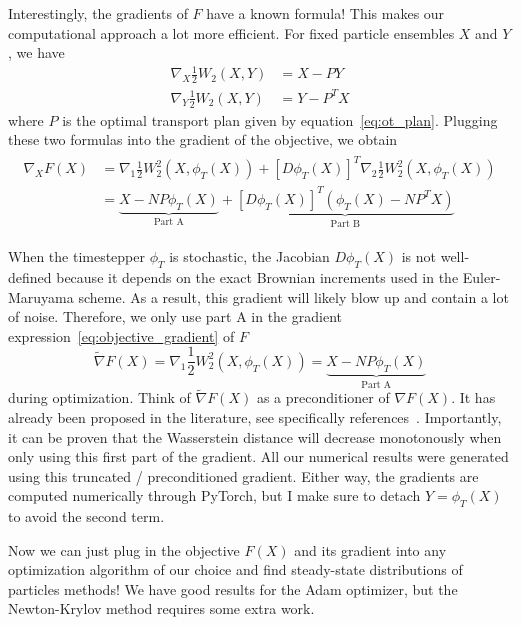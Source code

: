 \documentclass{article}
\begin{document}
Interestingly, the gradients of $F$ have a known formula! This makes our computational approach a lot more efficient. For fixed particle ensembles $X$ and $Y$, we have
\begin{align} \label{eq:sinkhorn_div_gradient}
    \nabla_X \frac{1}{2} W_2(X, Y) &= X - P Y \\
    \nabla_Y \frac{1}{2} W_2(X, Y) &= Y - P^T X
\end{align}
where $P$ is the optimal transport plan given by equation~\eqref{eq:ot_plan}. Plugging these two formulas into the gradient of the objective, we obtain
\begin{align} \label{eq:objective_gradient}
\begin{split}
    \nabla_X F(X) &= \nabla_1 \frac{1}{2} W_2^2(X, \phi_T(X)) + \left[D\phi_T(X)\right]^T  \nabla_2 \frac{1}{2} W_2^2(X, \phi_T(X)) \\ &= \underbrace{X - NP \phi_T(X)}_{\text{Part A}} + \underbrace{\left[D\phi_T(X)\right]^T \left(\phi_T(X) - NP^T X\right)}_{\text{Part B}}
\end{split}
\end{align}

When the timestepper $\phi_T$ is stochastic, the Jacobian $D\phi_T(X)$ is not well-defined because it depends on the exact Brownian increments used in the Euler-Maruyama scheme. As a result, this gradient will likely blow up and contain a lot of noise. Therefore, we only use part A in the gradient expression~\eqref{eq:objective_gradient} of $F$ 
\begin{equation}
    \tilde{\nabla} F(X) = \nabla_1 \frac{1}{2} W^2_2(X, \phi_T(X)) = \underbrace{X - NP \phi_T(X)}_{\text{Part A}}
\end{equation}
during optimization. Think of $\tilde{\nabla} F(X)$ as a preconditioner of $\nabla F(X)$. It has already been proposed in the literature, see specifically references~\cite{hunter2004tutorial,razaviyayn2013unified,benamou2015iterative}. Importantly, it can be proven that the Wasserstein distance will decrease monotonously when only using this first part of the gradient. All our numerical results were generated using this truncated / preconditioned gradient. Either way, the gradients are computed numerically through PyTorch, but I make sure to detach $Y = \phi_T(X)$ to avoid the second term. 

Now we can just plug in the objective $F(X)$ and its gradient into any optimization algorithm of our choice and find steady-state distributions of particles methods! We have good results for the Adam optimizer, but the Newton-Krylov method requires some extra work.
\end{document}

